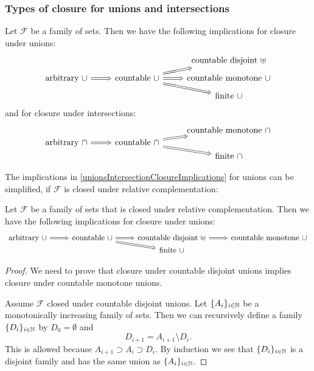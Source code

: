 \subsubsection{Types of closure for unions and intersections}
\begin{lemma} \label{unionsIntersectionClosureImplications}
Let $\mathcal{F}$ be a family of sets. Then we have the following implications for closure under unions:
\[ \begin{tikzcd}[row sep=tiny]
&& \text{countable disjoint $\uplus$} \\
\text{arbitrary $\cup$} \arrow[r, Rightarrow] & \text{countable $\cup$} \arrow[ur, Rightarrow] \arrow[r, Rightarrow] \arrow[dr, Rightarrow] & \text{countable monotone $\cup$} \\
&& \text{finite $\cup$}
\end{tikzcd} \]
and for closure under intersections:
\[ \begin{tikzcd}[row sep=0em]
&& \text{countable monotone $\cap$} \\
\text{arbitrary $\cap$} \arrow[r, Rightarrow] & \text{countable $\cap$} \arrow[ur, Rightarrow] \arrow[dr, Rightarrow] &  \\
&& \text{finite $\cap$}
\end{tikzcd} \]
\end{lemma}


The implications in \ref{unionsIntersectionClosureImplications} for unions can be simplified, if $\mathcal{F}$ is closed under relative complementation:
\begin{lemma} \label{typesOfUnionsRelativeComplementation}
Let $\mathcal{F}$ be a family of sets that is closed under relative complementation. Then we have the following implications for closure under unions:
\[ \begin{tikzcd}[row sep=0em]
\text{arbitrary $\cup$} \arrow[r, Rightarrow] & \text{countable $\cup$} \arrow[r, Rightarrow] \arrow[dr, Rightarrow] & \text{countable disjoint $\uplus$} \arrow[r, Rightarrow] & \text{countable monotone $\cup$} \\
&& \text{finite $\cup$} &
\end{tikzcd} \]
\end{lemma}
\begin{proof}
We need to prove that closure under countable disjoint unions implies closure under countable monotone unions.

Assume $\mathcal{F}$ closed under countable disjoint unions. Let $\{A_i\}_{i\in \mathbb{N}}$ be a monotonically increasing family of sets. Then we can recursively define a family $\{D_i\}_{i\in \mathbb{N}}$ by $D_0=\emptyset$ and
\[ D_{i+1} = A_{i+1}\setminus D_i. \]
This is allowed because $A_{i+1}\supset A_i \supset D_i$. By induction we see that $\{D_i\}_{i\in \mathbb{N}}$ is a disjoint family and has the same union as $\{A_i\}_{i\in \mathbb{N}}$.
\end{proof}

